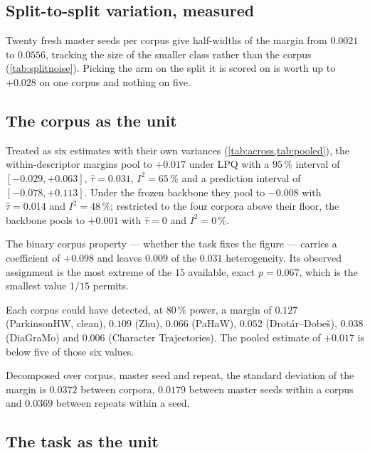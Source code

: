 

\subsection{Split-to-split variation, measured}
\label{sec:results-splitnoise}

Twenty fresh master seeds per corpus give half-widths of the margin from $0.0021$ to $0.0556$,
tracking the size of the smaller class rather than the corpus (\cref{tab:splitnoise}). Picking the
arm on the split it is scored on is worth up to $+0.028$ on one corpus and nothing on five.



\subsection{The corpus as the unit}
\label{sec:results-corpus-layer}

Treated as six estimates with their own variances (\cref{tab:across,tab:pooled}), the within-descriptor
margins pool to $+0.017$ under LPQ with a $95\,\%$ interval of $[-0.029, +0.063]$,
$\hat\tau = 0.031$, $I^2 = 65\,\%$ and a prediction interval of $[-0.078, +0.113]$. Under the frozen
backbone they pool to $-0.008$ with $\hat\tau = 0.014$ and $I^2 = 48\,\%$; restricted to the four
corpora above their floor, the backbone pools to $+0.001$ with $\hat\tau = 0$ and $I^2 = 0\,\%$.

The binary corpus property --- whether the task fixes the figure --- carries a coefficient of
$+0.098$ and leaves $0.009$ of the $0.031$ heterogeneity. Its observed assignment is the most
extreme of the $15$ available, exact $p = 0.067$, which is the smallest value $1/15$ permits.

Each corpus could have detected, at $80\,\%$ power, a margin of $0.127$ (ParkinsonHW, clean),
$0.109$ (Zhu), $0.066$ (PaHaW), $0.052$ (Drot\'ar--Dobe\v{s}), $0.038$ (DiaGraMo) and $0.006$
(Character Trajectories). The pooled estimate of $+0.017$ is below five of those six values.

Decomposed over corpus, master seed and repeat, the standard deviation of the margin is $0.0372$
between corpora, $0.0179$ between master seeds within a corpus and $0.0369$ between repeats within
a seed.




\subsection{The task as the unit}
\label{sec:results-task-layer}


